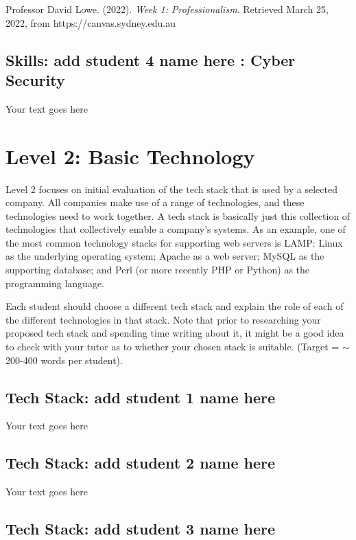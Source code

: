 \documentclass[a4paper, 11pt]{report}
\begin{document}
Professor David Lowe. (2022). \textit{Week 1: Professionalism}. Retrieved March 25, 2022, from https://canvas.sydney.edu.au\\

\subsection{Skills: add student 4 name here : Cyber Security}

Your text goes here



\newpage
\section{Level 2: Basic Technology}

Level 2 focuses on initial evaluation of the tech stack that is used by a selected company. All companies make use of a range of technologies, and these technologies need to work together. A tech stack is basically just this collection of technologies that collectively enable a company's systems. As an example, one of the most common technology stacks for supporting web servers is LAMP: Linux as the underlying operating system; Apache as a web server; MySQL as the supporting database; and Perl (or more recently PHP or Python) as the programming language.

Each student should choose a different tech stack and explain the role of each of the different technologies in that stack. Note that prior to researching your proposed tech stack and spending time writing about it, it might be a good idea to check with your tutor as to whether your chosen stack is suitable. (Target = $\sim$200-400 words per student).

\subsection{Tech Stack: add student 1 name here}

Your text goes here

\subsection{Tech Stack: add student 2 name here}

Your text goes here

\subsection{Tech Stack: add student 3 name here}
\end{document}
